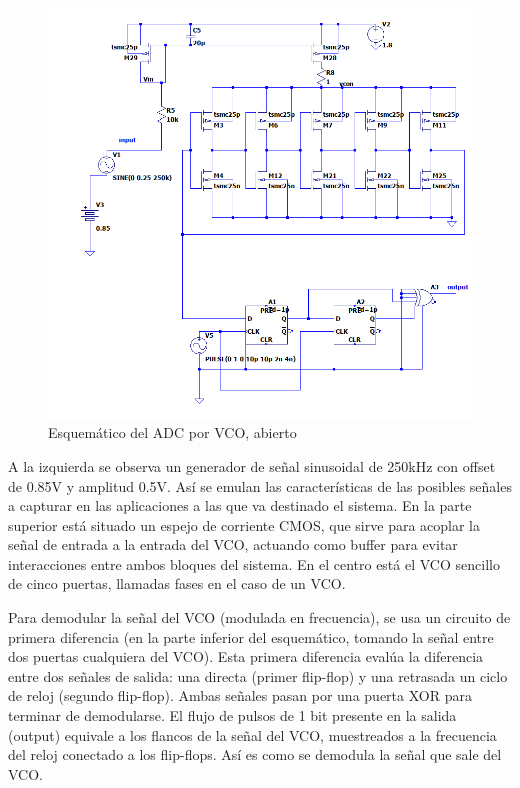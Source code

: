 \documentclass[12pt]{report} %
\begin{document}
	\begin{figure}[H]
		\includegraphics[width=\textwidth]{vco-open-first-diff-sch.png}
		\caption[Esquemático del ADC por VCO, abierto]{Esquemático del ADC por VCO, abierto}
		\label{fig:vco-open-first-diff-sch.png}
	\end{figure}
	
	A la izquierda se observa un generador de señal sinusoidal de 250kHz con offset de 0.85V y amplitud 0.5V. Así se emulan las características de las posibles señales a capturar en las aplicaciones a las que va destinado el sistema. En la parte superior está situado un espejo de corriente CMOS, que sirve para acoplar la señal de entrada a la entrada del VCO, actuando como buffer para evitar interacciones entre ambos bloques del sistema.
	En el centro está el VCO sencillo de cinco puertas, llamadas fases en el caso de un VCO. 
	
	
	Para demodular la señal del VCO (modulada en frecuencia), se usa un circuito de primera diferencia (en la parte inferior del esquemático, tomando la señal entre dos puertas cualquiera del VCO). Esta primera diferencia evalúa la diferencia entre dos señales de salida: una directa (primer flip-flop) y una retrasada un ciclo de reloj (segundo flip-flop). Ambas señales pasan por una puerta XOR para terminar de demodularse. El flujo de pulsos de 1 bit presente en la salida (output) equivale a los flancos de la señal del VCO, muestreados a la frecuencia del reloj conectado a los flip-flops. Así es como se demodula la señal que sale del VCO.
	
\end{document}
